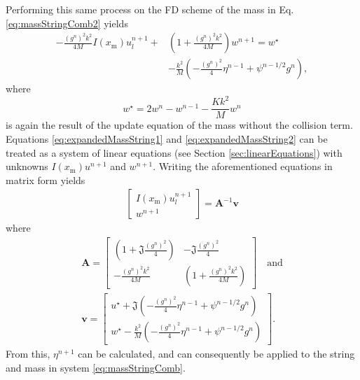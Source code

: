 Performing this same process on the FD scheme of the mass in Eq. \eqref{eq:massStringComb2} yields
\begin{equation}\label{eq:expandedMassString2}
    \begin{aligned}
    -\frac{(g^n)^2 k^2}{4M} I(x_\text{m})u_l^{n+1} + &\left(1 + \frac{(g^n)^2 k^2}{4M}\right)w^{n+1} = w^\star\\
    & - \frac{k^2}{M} \left(-\frac{(g^n)^2}{4}\eta^{n-1} + \psi^{n-1/2}g^n\right),
    \end{aligned}
\end{equation}
where 
\begin{equation*}
    w^\star = 2w^n - w^{n-1} - \frac{Kk^2}{M}w^n
\end{equation*}
is again the result of the update equation of the mass without the collision term.
Equations \eqref{eq:expandedMassString1} and \eqref{eq:expandedMassString2} can be treated as a system of linear equations (see Section \ref{sec:linearEquations}) with unknowns $I(x_\text{m})u^{n+1}$ and $w^{n+1}$. Writing the aforementioned equations in matrix form yields
\begin{align}
    \begin{bmatrix}
            I(x_\text{m})u^{n+1}_l\\
            w^{n+1}
        \end{bmatrix}
        = 
        \mathbf{A}^{-1}\mathbf{v}
    \end{align}
    where
    \begin{equation}
    \begin{gathered}
    \mathbf{A} = 
        \begin{bmatrix}
            \left(1 + \mathfrak{J}\frac{(g^n)^2}{4}\right) & -\mathfrak{J}\frac{(g^n)^2}{4}\\
            -\frac{(g^n)^2 k^2}{4M} &\left(1 + \frac{(g^n)^2 k^2}{4M}\right)
        \end{bmatrix}
        \quad \text{and}\\
        \mathbf{v} = 
        \begin{bmatrix}
            u^\star + \mathfrak{J} \left(-\frac{(g^n)^2}{4}\eta^{n-1} + \psi^{n-1/2}g^n\right)\\
            w^\star- \frac{k^2}{M} \left(-\frac{(g^n)^2}{4}\eta^{n-1} + \psi^{n-1/2}g^n\right)
        \end{bmatrix}.
        \nonumber
    \end{gathered}
\end{equation}
From this, $\eta^{n+1}$ can be calculated, and can consequently be applied to the string and mass in system \eqref{eq:massStringComb}.

